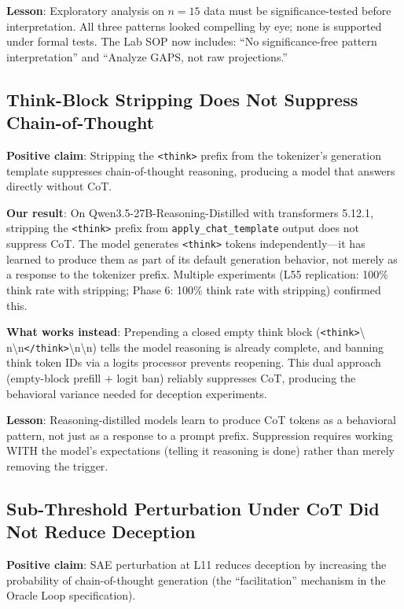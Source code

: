 \documentclass[11pt,letterpaper]{article}
\begin{document}
\textbf{Lesson}: Exploratory analysis on $n=15$ data must be significance-tested before
interpretation. All three patterns looked compelling by eye; none is supported under formal tests. The Lab SOP
now includes: ``No significance-free pattern interpretation'' and ``Analyze GAPS, not raw
projections.''

\subsection{Think-Block Stripping Does Not Suppress Chain-of-Thought}\label{sec:cot}

\textbf{Positive claim}: Stripping the \texttt{<think>} prefix from the tokenizer's generation
template suppresses chain-of-thought reasoning, producing a model that answers directly without CoT.

\textbf{Our result}: On Qwen3.5-27B-Reasoning-Distilled with transformers 5.12.1, stripping the
\texttt{<think>} prefix from \texttt{apply\_chat\_template} output does not suppress CoT. The model
generates \texttt{<think>} tokens independently---it has learned to produce them as part of its
default generation behavior, not merely as a response to the tokenizer prefix. Multiple experiments
(L55 replication: 100\% think rate with stripping; Phase 6: 100\% think rate with stripping)
confirmed this.

\textbf{What works instead}: Prepending a closed empty think block (\texttt{<think>}\textbackslash
n\textbackslash n\texttt{</think>}\textbackslash n\textbackslash n) tells the model reasoning is
already complete, and banning think token IDs via a logits processor prevents reopening. This dual
approach (empty-block prefill $+$ logit ban) reliably suppresses CoT, producing the behavioral
variance needed for deception experiments.

\textbf{Lesson}: Reasoning-distilled models learn to produce CoT tokens as a behavioral pattern, not
just as a response to a prompt prefix. Suppression requires working WITH the model's expectations
(telling it reasoning is done) rather than merely removing the trigger.

\subsection{Sub-Threshold Perturbation Under CoT Did Not Reduce Deception}\label{sec:iatrogenic}

\textbf{Positive claim}: SAE perturbation at L11 reduces deception by increasing the probability of
chain-of-thought generation (the ``facilitation'' mechanism in the Oracle Loop specification).
\end{document}
